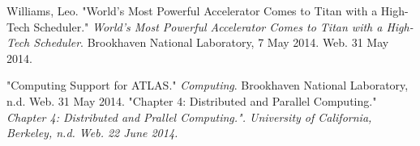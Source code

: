 \documentclass[letterpaper,english,12pt]{article}
\begin{document}
\begin{thebibliography}{1}
	 Williams, Leo. "World's Most Powerful Accelerator Comes to Titan with a High-Tech Scheduler." {\em World's Most Powerful Accelerator Comes to Titan with a High-Tech Scheduler}. Brookhaven National Laboratory, 7 May 2014. Web. 31 May 2014.

	 "Computing Support for ATLAS." {\em Computing}. Brookhaven National Laboratory, n.d. Web. 31 May 2014.
	 "Chapter 4: Distributed and Parallel Computing." \em{Chapter 4: Distributed and Prallel Computing."}. University of California, Berkeley, n.d. Web. 22 June 2014.
\end{thebibliography}
\end{document}
